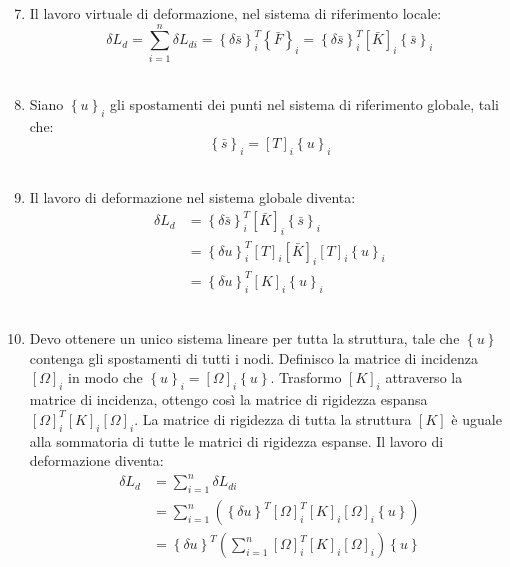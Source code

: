 \begin{enumerate}
 \setcounter{enumi}{6}
    \item Il lavoro virtuale di deformazione, nel sistema di riferimento locale:
    \begin{equation*}
        \delta L_d = \sum_{i=1}^n \delta L_{di} = \left\{\delta \bar{s}\right\}_i^T\left\{\bar{F}\right\}_i
        =\left\{\delta \bar{s}\right\}_i^T  [\bar{K}]_i  \left\{ \bar{s}\right\}_i
    \end{equation*}\\
    \item Siano $\left\{u\right\}_i$ gli spostamenti dei punti nel sistema di riferimento globale, tali che:
    \begin{equation*}
        \left\{ \bar{s}\right\}_i = [T]_i \left\{u\right\}_i
    \end{equation*}\\
    \item Il lavoro di deformazione nel sistema globale diventa:
    \begin{align*}
        \delta L_d  &=\left\{\delta \bar{s}\right\}_i^T  [\bar{K}]_i  \left\{ \bar{s}\right\}_i\\
        &=\left\{\delta u\right\}_i^T   [T]_i [\bar{K}]_i  [T]_i  \left\{ u\right\}_i\\
        &=\left\{\delta u\right\}_i^T  [K]_i  \left\{u\right\}_i
    \end{align*}\\
    \item Devo ottenere un unico sistema lineare per tutta la struttura, tale che $\left\{u\right\}$ contenga gli spostamenti di tutti i nodi. Definisco la matrice di incidenza $[\Omega]_i$ in modo che $\left\{u\right\}_i=[\Omega]_i \left\{u\right\}$. Trasformo $[K]_i $ attraverso la matrice di incidenza, ottengo così la matrice di rigidezza espansa $[\Omega]_i^T  [K]_i  [\Omega]_i$. La matrice di rigidezza di tutta la struttura $[K]$ è uguale alla sommatoria di tutte le matrici di rigidezza espanse. Il lavoro di deformazione diventa:
    \begin{align*}
        \delta L_d  &=\sum_{i=1}^n \delta L_{di} \\
        &= \sum_{i=1}^n  \left(    \left\{\delta u\right\}^T  [\Omega]_i^T  [K]_i  [\Omega]_i  \left\{ u\right\}    \right)\\
         &= \left\{\delta u\right\}^T  \left(\sum_{i=1}^n      [\Omega]_i^T  [K]_i  [\Omega]_i     \right) \left\{u\right\}
    \end{align*}\\

\end{enumerate}
